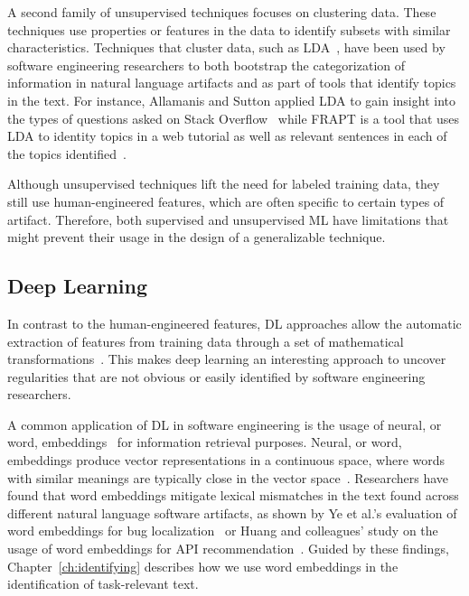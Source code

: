 A second family of unsupervised techniques focuses on clustering data.
These techniques use properties or features in the data to 
identify 
subsets with similar characteristics. 
Techniques that cluster data, such as \acf{LDA}~\cite{blei2003latent},
have been used by software engineering researchers to both 
bootstrap the categorization of information in 
natural language artifacts and as part of tools that identify topics in the text. 
For instance, Allamanis and Sutton
applied \acs{LDA}
to gain insight into the types of questions 
asked on Stack Overflow~\cite{Allamanis2013}
while FRAPT is a tool that 
uses \acs{LDA} to identity topics in a web tutorial
as well as relevant sentences in each of the topics identified~\cite{Jiang2017}.



Although unsupervised techniques lift the need for labeled training data,
they still use human-engineered features, 
which are often specific to certain 
types of artifact. Therefore, 
both supervised and unsupervised \acs{ML}
have limitations that might prevent their usage 
in the design of a generalizable technique.




\subsection{Deep Learning }
\label{cp2:deep-learning}



In contrast to the human-engineered features,
\acf{DL} approaches allow the automatic extraction of features 
from training data through a set of mathematical transformations~\cite{Deng2018, zhang2021deep}.
This makes 
deep learning an interesting 
approach to
uncover regularities 
that are not obvious or easily identified
by software engineering researchers.



A common application of \acs{DL} in software engineering is the usage of neural, or word, embeddings~\cite{Mikolov2013}
for information retrieval purposes. 
Neural, or word, embeddings produce vector representations in a continuous space,
where words with similar meanings are typically close in the vector space~\cite{harris1954distributional, mikolov2013efficient}. 
Researchers have found that word
embeddings mitigate lexical mismatches in the text found across different 
natural language software artifacts,
as shown by Ye et al.'s evaluation of word embeddings
for bug localization~\cite{Ye2016}
or Huang and colleagues' study on 
the usage of word embeddings for API recommendation~\cite{Huang2018}.
Guided by these findings, Chapter~\ref{ch:identifying} describes 
how we use word embeddings in the identification 
of task-relevant text.



